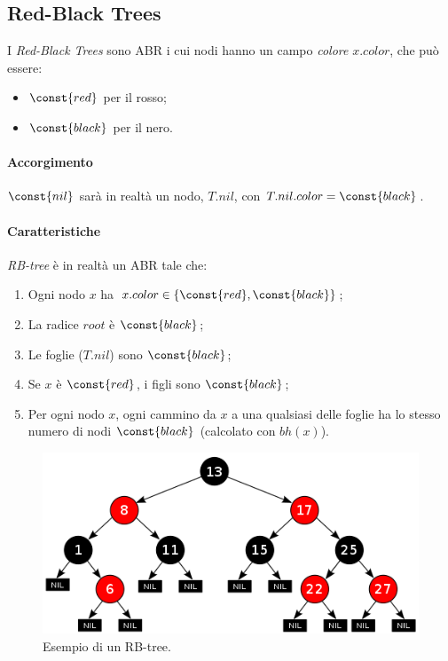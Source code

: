 \subsection{Red-Black Trees}

I \emph{Red-Black Trees} sono ABR i cui nodi hanno un campo \emph{colore} $x.color$, che può essere:
\begin{itemize}[noitemsep]
    \item $\const{red}$ per il rosso;
    \item $\const{black}$ per il nero.
\end{itemize}

\paragraph{Accorgimento} $\const{nil}$ sarà in realtà un nodo,
$T.nil$, con $T.nil.color = \const{black}$.

\paragraph{Caratteristiche} \emph{RB-tree} è in realtà un ABR tale che:
\begin{enumerate}[label=($\arabic*$)]
    \item Ogni nodo $x$ ha $x.color \in \{\const{red},\const{black}\}$; \label{rbtree:1}
    \item La radice $root$ è $\const{black}$; \label{rbtree:2}
    \item Le foglie ($T.nil$) sono $\const{black}$; \label{rbtree:3}
    \item Se $x$ è $\const{red}$, i figli sono $\const{black}$; \label{rbtree:4}
    \item Per ogni nodo $x$, ogni cammino da $x$ a una qualsiasi delle foglie
    ha lo stesso numero di nodi $\const{black}$ (calcolato con $bh(x)$). \label{rbtree:5}
\end{enumerate} 

\begin{figure}[hbt]
    \centering
    \includegraphics[width=\textwidth]{img/rb-tree-ex.png}
    \caption{Esempio di un RB-tree.}
\end{figure}
\pagebreak

